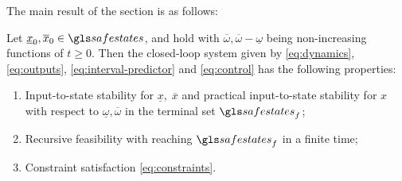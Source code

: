 The main result of the section is as follows:
\begin{theorem}
	\begin{leftbar}[theorembar]
	\label{thm:robust-constraint-sat}
	Let $\underline{x}_{0},\overline{x}_{0}\in\safestates$, and  hold with $\overline{\omega},\overline{\omega}-\underline{\omega}$ being non-increasing functions of $t\geq0$. Then the closed-loop system given by \eqref{eq:dynamics}, \eqref{eq:outputs}, \eqref{eq:interval-predictor} and \eqref{eq:control} has the following properties:
	\begin{enumerate}
		\item Input-to-state stability for $\underline{x},\;\overline{x}$ and practical input-to-state stability for $x$ with respect to $\underline{\omega},\overline{\omega}$ in the terminal set $\safestates_{f}$; 
		\item Recursive feasibility with reaching $\safestates_{f}$ in a finite time; 
		\item Constraint satisfaction \eqref{eq:constraints}.
	\end{enumerate}
\end{leftbar}
\end{theorem}
